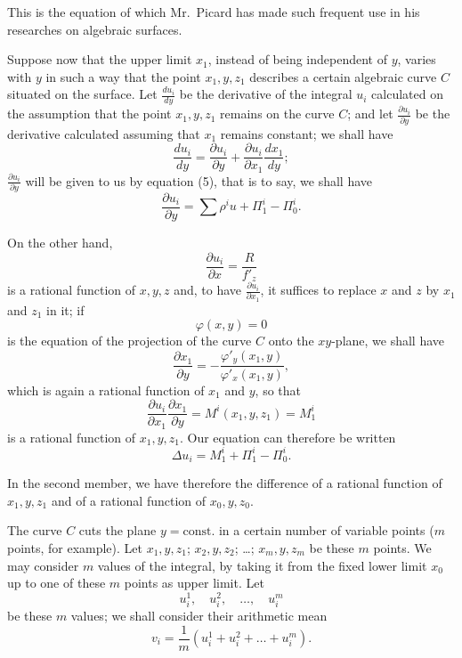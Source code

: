 \documentclass{article}
\begin{document}
This is the equation of which Mr.~Picard has made such frequent use in his researches on algebraic surfaces.

Suppose now that the upper limit $x_{1}$, instead of being independent of $y$, varies with $y$ in such a way that the point $x_{1}, y, z_{1}$ describes a certain algebraic curve $C$ situated on the surface. Let $\displaystyle\frac{du_{i}}{dy}$ be the derivative of the integral $u_{i}$ calculated on the assumption that the point $x_{1}, y, z_{1}$ remains on the curve $C$; and let $\displaystyle\frac{\partial u_{i}}{\partial y}$ be the derivative calculated assuming that $x_{1}$ remains constant; we shall have
\[
\frac{du_{i}}{dy} = \frac{\partial u_{i}}{\partial y} + \frac{\partial u_{i}}{\partial x_{1}} \frac{dx_{1}}{dy};
\]
$\displaystyle\frac{\partial u_{i}}{\partial y}$ will be given to us by equation (5), that is to say, we shall have
\[
\frac{\partial u_{i}}{\partial y} = \sum \rho^{i} u + \Pi_{1}^{i} - \Pi_{0}^{i}.
\]

On the other hand,
\[
\frac{\partial u_{i}}{\partial x} = \frac{R}{f'_{z}}
\]
is a rational function of $x, y, z$ and, to have $\displaystyle\frac{\partial u_{i}}{\partial x_{1}}$, it suffices to replace $x$ and $z$ by $x_{1}$ and $z_{1}$ in it; if
\[
\varphi(x, y) = 0
\]
is the equation of the projection of the curve $C$ onto the $xy$-plane, we shall have
\[
\frac{\partial x_{1}}{\partial y} = - \frac{\varphi'_{y}(x_{1}, y)}{\varphi'_{x}(x_{1}, y)},
\]
which is again a rational function of $x_{1}$ and $y$, so that
\[
\frac{\partial u_{i}}{\partial x_{1}} \frac{\partial x_{1}}{\partial y} = M^{i}(x_{1}, y, z_{1}) = M_{1}^{i}
\]
is a rational function of $x_{1}, y, z_{1}$. Our equation can therefore be written
\[
\Delta u_{i} = M_{1}^{i} + \Pi_{1}^{i} - \Pi_{0}^{i}. \tag{5 c}
\]

In the second member, we have therefore the difference of a rational function of $x_{1}, y, z_{1}$ and of a rational function of $x_{0}, y, z_{0}$.

The curve $C$ cuts the plane $y = \text{const.}$ in a certain number of variable points ($m$ points, for example). Let $x_{1}, y, z_{1}$; $x_{2}, y, z_{2}$; \ldots; $x_{m}, y, z_{m}$ be these $m$ points. We may consider $m$ values of the integral, by taking it from the fixed lower limit $x_{0}$ up to one of these $m$ points as upper limit. Let
\[
u_{i}^{1}, \quad u_{i}^{2}, \quad \ldots, \quad u_{i}^{m}
\]
be these $m$ values; we shall consider their arithmetic mean
\[
v_{i} = \frac{1}{m} (u_{i}^{1} + u_{i}^{2} + \ldots + u_{i}^{m}).
\]
\end{document}
